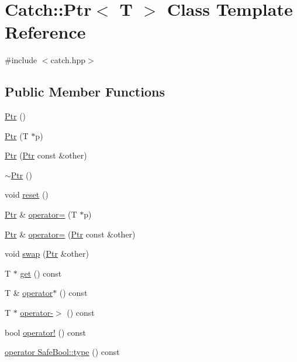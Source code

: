 \hypertarget{class_catch_1_1_ptr}{}\section{Catch\+:\+:Ptr$<$ T $>$ Class Template Reference}
\label{class_catch_1_1_ptr}


{\ttfamily \#include $<$catch.\+hpp$>$}

\subsection*{Public Member Functions}
\begin{DoxyCompactItemize}
\item 
\hyperlink{class_catch_1_1_ptr_a6108f0195595ee9d7a411daea810beaf}{Ptr} ()
\item 
\hyperlink{class_catch_1_1_ptr_aacec063a79cd142e39040a31c6b3c40b}{Ptr} (T $\ast$p)
\item 
\hyperlink{class_catch_1_1_ptr_ac629dd8ebe5763a37bb89e6c1d6a1771}{Ptr} (\hyperlink{class_catch_1_1_ptr}{Ptr} const \&other)
\item 
\hyperlink{class_catch_1_1_ptr_ac96d3bb33adcfb983207385cfba5fe8a}{$\sim$\+Ptr} ()
\item 
void \hyperlink{class_catch_1_1_ptr_af8d0fa7a2cd20842830b354ac31dfe5c}{reset} ()
\item 
\hyperlink{class_catch_1_1_ptr}{Ptr} \& \hyperlink{class_catch_1_1_ptr_a9b08c868b447d679ed201921f5c94683}{operator=} (T $\ast$p)
\item 
\hyperlink{class_catch_1_1_ptr}{Ptr} \& \hyperlink{class_catch_1_1_ptr_af42074444c1bc6a70ebdc406a8617708}{operator=} (\hyperlink{class_catch_1_1_ptr}{Ptr} const \&other)
\item 
void \hyperlink{class_catch_1_1_ptr_a172bf8b4e71e26a5a4d92f5b02158b50}{swap} (\hyperlink{class_catch_1_1_ptr}{Ptr} \&other)
\item 
T $\ast$ \hyperlink{class_catch_1_1_ptr_a2158bb2a1a21b001a2e72d4591d3e31e}{get} () const
\item 
T \& \hyperlink{class_catch_1_1_ptr_a8d73989b1c77a1cab6152766feaa837f}{operator$\ast$} () const
\item 
T $\ast$ \hyperlink{class_catch_1_1_ptr_acc0996cbd99f360069260a898b3f4fda}{operator-\/$>$} () const
\item 
bool \hyperlink{class_catch_1_1_ptr_a85c4fe6cebf2a69d0416020b65714360}{operator!} () const
\item 
\hyperlink{class_catch_1_1_ptr_a102838cb25643586679e12efca26a3af}{operator Safe\+Bool\+::type} () const
\end{DoxyCompactItemize}


